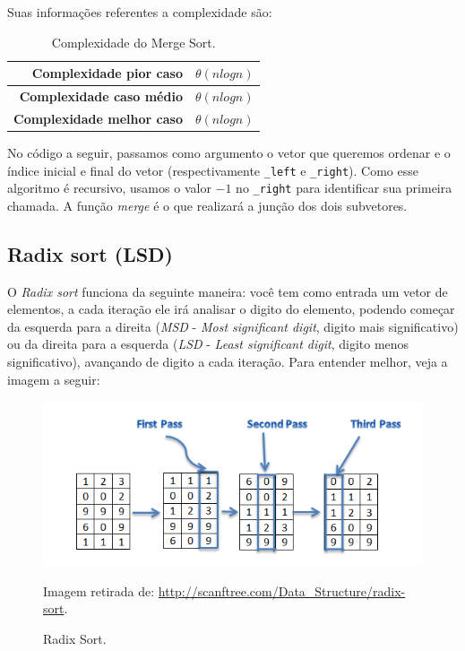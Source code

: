Suas informações referentes a complexidade são:

\begin{table}[H]
 \centering
	\begin{tabular}{| r | l |}
		\hline
		\textbf{Complexidade pior caso}   & $\theta(nlogn)$ \\
		\hline
		\textbf{Complexidade caso médio}  & $\theta(nlogn)$ \\
		\hline
		\textbf{Complexidade melhor caso} & $\theta(nlogn)$ \\
		\hline
	\end{tabular}
	\caption{Complexidade do Merge Sort.}
	\label{t_merge_sort}
\end{table}

No código a seguir, passamos como argumento o vetor que queremos ordenar e o índice inicial e final do vetor (respectivamente \texttt{\_left} e \texttt{\_right}). Como esse algoritmo é recursivo, usamos o valor $-1$ no \texttt{\_right} para identificar sua primeira chamada. A função \textit{merge} é o que realizará a junção dos dois subvetores.



\subsection{Radix sort (LSD)}
O \textit{Radix sort} funciona da seguinte maneira: você tem como entrada um vetor de elementos, a cada iteração ele irá analisar o digito do elemento, podendo começar da esquerda para a direita (\textit{MSD} - \textit{Most significant digit}, digito mais significativo) ou da direita para a esquerda (\textit{LSD} - \textit{Least significant digit}, digito menos significativo), avançando de digito a cada iteração. Para entender melhor, veja a imagem a seguir:

\begin{figure}[H]
	\centering
	\includegraphics[scale=0.6]{img/radix_sort.png}
	\caption{Radix Sort.}
	\small{Imagem retirada de: \url{http://scanftree.com/Data_Structure/radix-sort}.}
	\label{radix-sort}
\end{figure}

